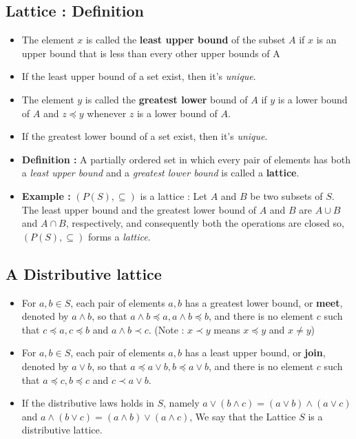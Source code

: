 \subsection{Lattice : Definition}
    \begin{itemize}
        \item The element $x$ is called the \textbf{least upper bound} of the subset $A$ if $x$ is an upper bound that is less than every other upper bounds of A
         
        \item If the least upper bound of a set exist, then it's \textit{unique}.
         
        \item The element $y$ is called the \textbf{greatest lower} bound of $A$ if $y$ is a lower bound of $A$ and $z \preceq y$ whenever $z$ is a lower bound of $A$.
         
        \item If the greatest lower bound of a set exist, then it's \textit{unique}.
         
        \item \textbf{Definition :} A partially ordered set in which every pair of elements has both a \textit{least upper bound} and a \textit{greatest lower bound} is called a \textbf{lattice}.
         
        \item \textbf{Example :} $(P(S), \subseteq)$ is a lattice : Let $A$ and $B$ be two subsets of $S$. The least upper bound and the greatest lower bound of $A$ and $B$ are $A \cup B$ and $A \cap B$, respectively, and consequently both the operations are closed so, $(P(S), \subseteq)$ forms a \textit{lattice}.
    \end{itemize}

\subsection{A Distributive lattice}
    \begin{itemize}
        \item  For $a, b \in S$, each pair of elements $a, b$ has a greatest lower bound, or \textbf{meet}, denoted by $a \land b$, so that $a \land b \preceq a, a \land b \preceq b$, and there is no element $c$ such that $c \preceq a, c \preceq b$ and $a \land b \prec c$. (Note : $x \prec y$ means $x \preceq y$ and $x \neq y$)
         
        \item For $a, b \in S$, each pair of elements $a, b$ has a least upper bound, or \textbf{join}, denoted by $a \lor b$, so that $a  \preceq a \lor b, b \preceq a \lor b$, and there is no element $c$ such that $a \preceq c, b \preceq c$ and $c \prec a \lor b$.
         
        \item  If the distributive laws holds in $S$, namely $a \lor (b \land c) = (a \lor b)\land(a \lor c)$ and $a \land (b \lor c) = (a  \land b)\lor(a \land c)$, We say that the Lattice $S$ is a distributive lattice.
    \end{itemize}    

